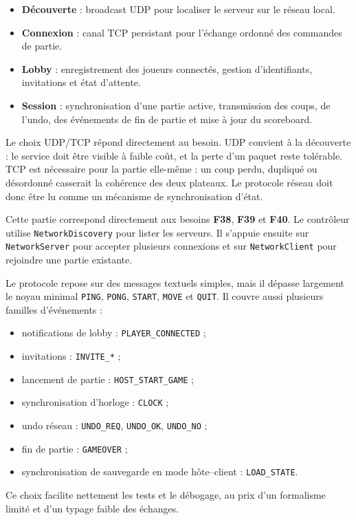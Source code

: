 \documentclass[a4paper]{article}
\begin{document}
\begin{itemize}
    \item \textbf{Découverte} : broadcast UDP pour localiser le serveur sur le réseau local.
    \item \textbf{Connexion} : canal TCP persistant pour l'échange ordonné des commandes de partie.
    \item \textbf{Lobby} : enregistrement des joueurs connectés, gestion d'identifiants, invitations et état d'attente.
    \item \textbf{Session} : synchronisation d'une partie active, transmission des coups, de l'undo, des événements de fin de partie et mise à jour du scoreboard.
\end{itemize}

Le choix UDP/TCP répond directement au besoin. UDP convient à la découverte : le service doit être visible à faible coût, et la perte d'un paquet reste tolérable. TCP est nécessaire pour la partie elle-même : un coup perdu, dupliqué ou désordonné casserait la cohérence des deux plateaux. Le protocole réseau doit donc être lu comme un mécanisme de synchronisation d'état.

Cette partie correspond directement aux besoins \textbf{F38}, \textbf{F39} et \textbf{F40}. Le contrôleur utilise \texttt{NetworkDiscovery} pour lister les serveurs. Il s'appuie ensuite sur \texttt{NetworkServer} pour accepter plusieurs connexions et sur \texttt{NetworkClient} pour rejoindre une partie existante.

Le protocole repose sur des messages textuels simples, mais il dépasse largement le noyau minimal \texttt{PING}, \texttt{PONG}, \texttt{START}, \texttt{MOVE} et \texttt{QUIT}. Il couvre aussi plusieurs familles d'événements :
\begin{itemize}
    \item notifications de lobby : \texttt{PLAYER\_CONNECTED} ;
    \item invitations : \texttt{INVITE\_*} ;
    \item lancement de partie : \texttt{HOST\_START\_GAME} ;
    \item synchronisation d'horloge : \texttt{CLOCK} ;
    \item undo réseau : \texttt{UNDO\_REQ}, \texttt{UNDO\_OK}, \texttt{UNDO\_NO} ;
    \item fin de partie : \texttt{GAMEOVER} ;
    \item synchronisation de sauvegarde en mode hôte--client : \texttt{LOAD\_STATE}.
\end{itemize}
Ce choix facilite nettement les tests et le débogage, au prix d'un formalisme limité et d'un typage faible des échanges.
\end{document}
